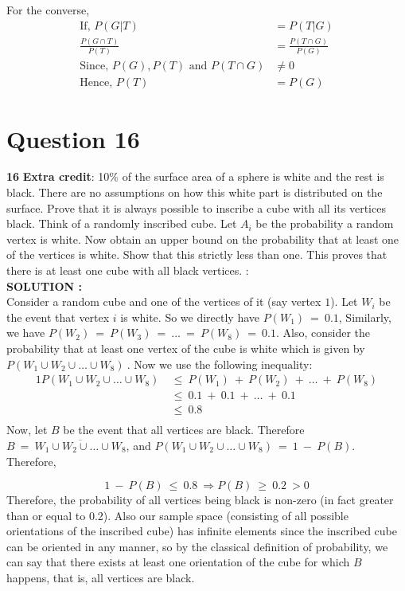 \documentclass{article}
\begin{document}
For the converse, \\
\begin{align*}
	\text{If, } P(G|T) &= P(T|G) \\
	\frac{P(G \cap T)}{P(T)} &= \frac{P(T \cap G)}{P(G)} \\
	\text{Since, } P(G), P(T) \text{ and }  P(T \cap G) & \neq 0 \\
	\text{Hence, } P(T) &= P(G)
\end{align*}

\section{Question 16}
\label{Q16}
\textbf{16} \textbf{Extra credit}: 10\% of the surface area of a sphere is white and the rest is black. There are no assumptions on how this white part is distributed on the surface. Prove that it is always possible to inscribe a cube with all its vertices black. Think of a randomly inscribed cube. Let $A_i$ be the probability a random vertex is white. Now obtain an upper bound on the probability that at least one of the vertices is white. Show that this strictly less than one. This proves that there is at least one cube with all black vertices.
 : \\

\hspace{1em} \large{\textbf{SOLUTION :}} \\
Consider a random cube and one of the vertices of it (say vertex $1$). Let $W_i$ be the event that vertex $i$ is white. So we directly have $P(W_1)\ =\ 0.1$, Similarly, we have $P(W_2)\ =\ P(W_3)\ =\ \dots\ =\ P(W_8)\ =\ 0.1$. Also, consider the probability that at least one vertex of the cube is white which is given by $P(W_1\cup W_2\cup \dots \cup W_8)\ $. Now we use the following inequality:  
\begin{alignat*}{1}
    P(W_1\cup W_2\cup \dots \cup W_8)\ &\leq \ P(W_1)\ +\ P(W_2)\ +\ \dots\ +\ P(W_8)\\
                                    &\leq\ 0.1\ +\ 0.1\ +\ \dots\ +\ 0.1 \\
                                    &\leq\ 0.8\\
\end{alignat*}
Now, let $B$ be the event that all vertices are black. Therefore $B\ =\ \overline{W_1\cup W_2\cup \dots \cup W_8}$, and $P(W_1\cup W_2\cup \dots \cup W_8)\ =\ 1\ -\ P(B)$. Therefore,

\begin{equation*}
    1\ -\ P(B)\ \leq\ 0.8\ \Longrightarrow P(B)\ \geq\ 0.2\ > 0
\end{equation*}
Therefore, the probability of all vertices being black is non-zero (in fact greater than or equal to 0.2). Also our sample space (consisting of all possible orientations of the inscribed cube) has infinite elements since the inscribed cube can be oriented in any manner, so by the classical definition of probability, we can say that there exists at least one orientation of the cube for which $B$ happens, that is, all vertices are black. 
\end{document}

